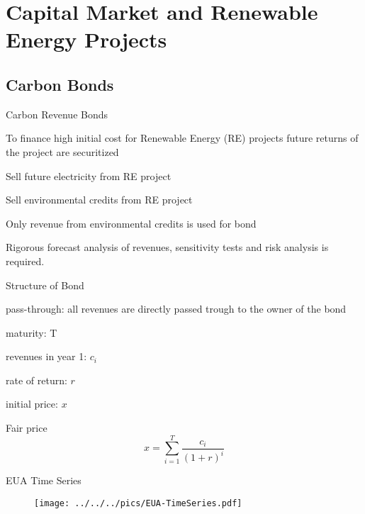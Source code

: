 \section{Capital Market and Renewable Energy Projects}
\subsection{Carbon Bonds}

{Carbon Revenue Bonds}




\item<1-> To finance high initial cost for Renewable Energy (RE) projects future returns of the project are securitized
\item<2->




\item Sell future electricity from RE project
\item Sell environmental credits from RE project




\item<3-> Only revenue from environmental credits is used for bond
\item<4-> Rigorous forecast analysis of revenues, sensitivity tests and risk analysis is required.





{Structure of Bond}




\item<1-> pass-through: all revenues are directly passed trough to the owner of the bond
\item<2->




\item maturity: T
\item revenues in year 1: $c_i$
\item rate of return: $r$
\item initial price: $x$




\item<3-> Fair price
$$
x= \sum_{i=1}^T \frac{c_i}{(1+r)^i}
$$





{EUA Time Series}
\begin{figure}[h!]
\centering
\texttt{[image: ../../../pics/EUA-TimeSeries.pdf]}
\label{fig:EUA-TS}
\end{figure}

